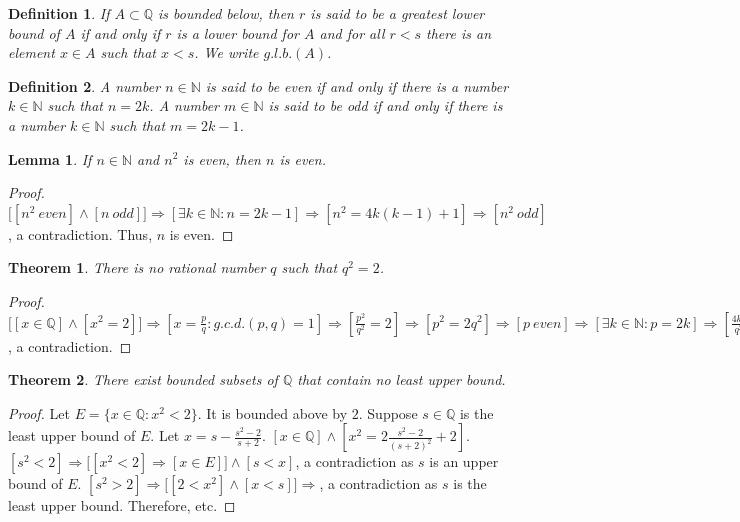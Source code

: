 \documentclass[oneside]{book}
\theoremstyle{mystyle}
\newtheorem{theorem}{Theorem}[section]
\newtheorem{definition}{Definition}[section]
\newtheorem{lemma}{Lemma}[section]
\begin{document}
\begin{definition}
If $A\subset \mathbb{Q}$ is bounded below, then $r$ is said to be a greatest lower bound of $A$ if and only if $r$ is a lower bound for $A$ and for all $r<s$ there is an element $x\in A$ such that $x<s$. We write $g.l.b.(A)$.
\end{definition}

\begin{definition}
A number $n\in \mathbb{N}$ is said to be even if and only if there is a number $k\in \mathbb{N}$ such that $n=2k$. A number $m\in \mathbb{N}$ is said to be odd if and only if there is a number $k\in \mathbb{N}$ such that $m=2k-1$.
\end{definition}

\begin{lemma}
If $n\in \mathbb{N}$ and $n^2$ is even, then $n$ is even.
\end{lemma}
\begin{proof}
$\big[[n^2\ even]\land [n\ odd]\big]\Rightarrow [\exists k\in \mathbb{N}:n=2k-1]\Rightarrow [n^2 = 4k(k-1)+1]\Rightarrow [n^2\ odd]$, a contradiction. Thus, $n$ is even.
\end{proof}

\begin{theorem}
There is no rational number $q$ such that $q^2 = 2$.
\end{theorem}
\begin{proof}
$\big[[x\in \mathbb{Q}]\land [x^2=2]\big]\Rightarrow [x= \frac{p}{q}:g.c.d.(p,q)=1]\Rightarrow [\frac{p^2}{q^2}= 2]\Rightarrow [p^2 = 2q^2]\Rightarrow [p\ even]\Rightarrow [\exists k\in \mathbb{N}:p=2k]\Rightarrow [\frac{4k^2}{q^2}=2]\Rightarrow [q^2 = 2k^2]\Rightarrow [q\ even]\Rightarrow [g.c.d.(p,q)\geq 2]$, a contradiction.
\end{proof}

\begin{theorem}
There exist bounded subsets of $\mathbb{Q}$ that contain no least upper bound.
\end{theorem}
\begin{proof}
Let $E=\{x\in \mathbb{Q}:x^2 < 2\}$. It is bounded above by $2$. Suppose $s\in \mathbb{Q}$ is the least upper bound of $E$. Let $x = s - \frac{s^2-2}{s+2}$. $[x\in \mathbb{Q}] \land [x^2 = 2\frac{s^2-2}{(s+2)^2}+2]$. $[s^2<2]\Rightarrow \big[[x^2<2 ]\Rightarrow [x\in E]\big]\land [s<x]$, a contradiction as $s$ is an upper bound of $E$. $[s^2>2]\Rightarrow \big[[2<x^2 ]\land [x<s]\big]\Rightarrow$, a contradiction as $s$ is the least upper bound. Therefore, etc.
\end{proof}
\end{document}
